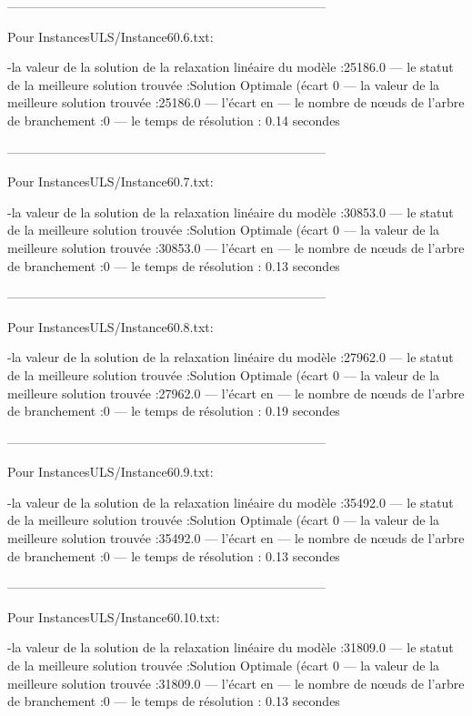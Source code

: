 ---------------------------------------------------------------------------

Pour InstancesULS/Instance60.6.txt:


-la valeur de la solution de la relaxation linéaire du modèle :25186.0
— le statut de la meilleure solution trouvée :Solution Optimale (écart 0%
— la valeur de la meilleure solution trouvée :25186.0
— l’écart en %
— le nombre de nœuds de l’arbre de branchement :0
— le temps de résolution : 0.14 secondes


---------------------------------------------------------------------------

Pour InstancesULS/Instance60.7.txt:


-la valeur de la solution de la relaxation linéaire du modèle :30853.0
— le statut de la meilleure solution trouvée :Solution Optimale (écart 0%
— la valeur de la meilleure solution trouvée :30853.0
— l’écart en %
— le nombre de nœuds de l’arbre de branchement :0
— le temps de résolution : 0.13 secondes


---------------------------------------------------------------------------

Pour InstancesULS/Instance60.8.txt:


-la valeur de la solution de la relaxation linéaire du modèle :27962.0
— le statut de la meilleure solution trouvée :Solution Optimale (écart 0%
— la valeur de la meilleure solution trouvée :27962.0
— l’écart en %
— le nombre de nœuds de l’arbre de branchement :0
— le temps de résolution : 0.19 secondes


---------------------------------------------------------------------------

Pour InstancesULS/Instance60.9.txt:


-la valeur de la solution de la relaxation linéaire du modèle :35492.0
— le statut de la meilleure solution trouvée :Solution Optimale (écart 0%
— la valeur de la meilleure solution trouvée :35492.0
— l’écart en %
— le nombre de nœuds de l’arbre de branchement :0
— le temps de résolution : 0.13 secondes


---------------------------------------------------------------------------

Pour InstancesULS/Instance60.10.txt:


-la valeur de la solution de la relaxation linéaire du modèle :31809.0
— le statut de la meilleure solution trouvée :Solution Optimale (écart 0%
— la valeur de la meilleure solution trouvée :31809.0
— l’écart en %
— le nombre de nœuds de l’arbre de branchement :0
— le temps de résolution : 0.13 secondes


